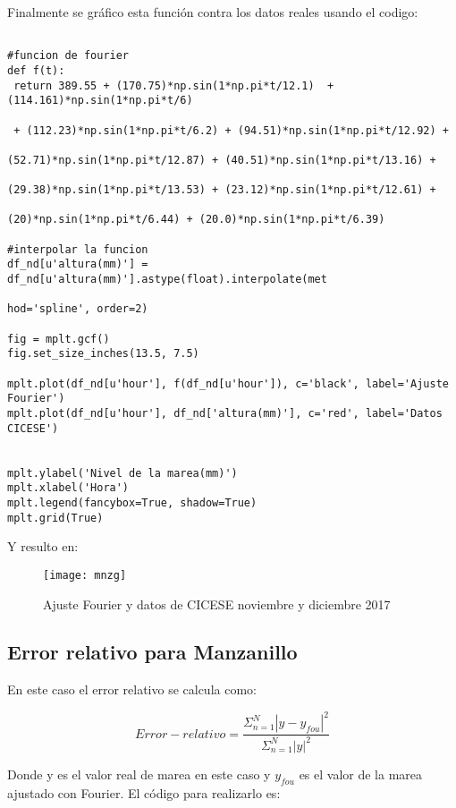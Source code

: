 \documentclass[12pt,letterpaper]{article}
\begin{document}
Finalmente se gráfico esta función contra los datos reales usando el codigo:

\begin{verbatim}

#funcion de fourier
def f(t):
 return 389.55 + (170.75)*np.sin(1*np.pi*t/12.1)  + (114.161)*np.sin(1*np.pi*t/6) 
 
 + (112.23)*np.sin(1*np.pi*t/6.2) + (94.51)*np.sin(1*np.pi*t/12.92) +
 
(52.71)*np.sin(1*np.pi*t/12.87) + (40.51)*np.sin(1*np.pi*t/13.16) +

(29.38)*np.sin(1*np.pi*t/13.53) + (23.12)*np.sin(1*np.pi*t/12.61) +

(20)*np.sin(1*np.pi*t/6.44) + (20.0)*np.sin(1*np.pi*t/6.39)    

#interpolar la funcion
df_nd[u'altura(mm)'] = df_nd[u'altura(mm)'].astype(float).interpolate(met

hod='spline', order=2)

fig = mplt.gcf()
fig.set_size_inches(13.5, 7.5)

mplt.plot(df_nd[u'hour'], f(df_nd[u'hour']), c='black', label='Ajuste Fourier')
mplt.plot(df_nd[u'hour'], df_nd['altura(mm)'], c='red', label='Datos CICESE')


mplt.ylabel('Nivel de la marea(mm)')
mplt.xlabel('Hora')
mplt.legend(fancybox=True, shadow=True)
mplt.grid(True)
\end{verbatim}

Y resulto en:

\begin{figure}[H]
	\centering	\texttt{[image: mnzg]}
	\caption{Ajuste Fourier y datos de CICESE noviembre y diciembre 2017}
\end{figure}


\subsection{Error relativo para Manzanillo}

En este caso el error relativo se calcula como\cite{c}:

\begin{equation}
Error-relativo = \frac{ \Sigma_{n=1}^{N}|y-y_{fou}|^{2} }{ \Sigma_{n=1}^{N}|y|^2 }
\end{equation}

Donde y es el valor real de marea en este caso y $y_{fou}$ es el valor de la marea ajustado con Fourier. El código para realizarlo es:
\end{document}
